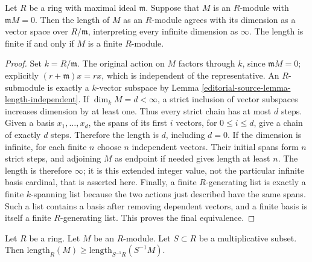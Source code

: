 \begin{lemma}
\label{editorial-source-lemma-dimension-is-length}
Let $R$ be a ring with maximal ideal $\mathfrak m$.
Suppose that $M$ is an $R$-module with
$\mathfrak m M  =  0$. Then the length of $M$ as
an $R$-module agrees with its dimension as a vector space over
$R/\mathfrak m$, interpreting every infinite dimension as $\infty$.
The length is finite if and only if $M$ is a finite $R$-module.
\end{lemma}

\begin{proof}
Set $k=R/\mathfrak m$. The original action on $M$ factors
through $k$, since $\mathfrak mM=0$; explicitly
$(r+\mathfrak m)x=rx$, which is independent of the representative.
An $R$-submodule is exactly a $k$-vector subspace by
Lemma \ref{editorial-source-lemma-length-independent}.
If $\dim_k M=d<\infty$, a strict inclusion of vector subspaces
increases dimension by at least one. Thus every strict chain has
at most $d$ steps. Given a basis $x_1,\ldots,x_d$, the spans
of its first $i$ vectors, for $0\leq i\leq d$, give a chain
of exactly $d$ steps. Therefore the length is $d$, including $d=0$.
If the dimension is infinite, for each finite $n$ choose
$n$ independent vectors. Their initial spans form $n$ strict
steps, and adjoining $M$ as endpoint if needed gives length at
least $n$. The length is therefore $\infty$; it is this extended
integer value, not the particular infinite basis cardinal, that
is asserted here.
Finally, a finite $R$-generating list is exactly a finite
$k$-spanning list because the two actions just described have the
same spans. Such a list contains a basis after removing dependent
vectors, and a finite basis is itself a finite $R$-generating
list. This proves the final equivalence.
\end{proof}

\begin{lemma}
\label{editorial-source-lemma-length-localize}
Let $R$ be a ring. Let $M$ be an $R$-module. Let $S \subset R$ be
a multiplicative subset. Then
$\text{length}_R(M) \geq \text{length}_{S^{-1}R}(S^{-1}M)$.
\end{lemma}

